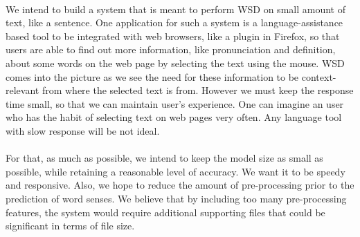 \paragraph{}
We intend to build a system that is meant to perform WSD on small amount of text, like a sentence. One application for such a system is a language-assistance based tool to be integrated with web browsers, like a plugin in Firefox, so that users are able to find out more information, like pronunciation and definition, about some words on the web page by selecting the text using the mouse. WSD comes into the picture as we see the need for these information to be context-relevant from where the selected text is from. However we must keep the response time small, so that we can maintain user's experience. One can imagine an user who has the habit of selecting text on web pages very often. Any language tool with slow response will be not ideal.

\paragraph{}
For that, as much as possible, we intend to keep the model size as small as possible, while retaining a reasonable level of accuracy. We want it to be speedy and responsive. Also, we hope to reduce the amount of pre-processing prior to the prediction of word senses. We believe that by including too many pre-processing features, the system would require additional supporting files that could be significant in terms of file size. 